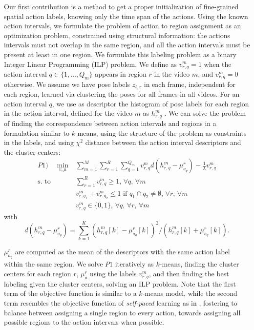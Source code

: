Our first contribution is a method to get a proper initialization of fine-grained spatial action labels, knowing only the time span of the actions. Using the known action intervals,  we formulate the problem of action to region assignment as an optimization problem, constrained using structural information: the actions intervals must not overlap in the same region, and all the action intervals must be present at least in one region. We formulate this labeling problem as a binary Integer Linear Programming (ILP) problem. We define as $v_{r,q}^m=1$ when the action interval $q \in \{1,\dots,Q_m\}$ appears in region $r$ in the video $m$, and $v_{r,q}^m=0$ otherwise. We assume we have pose labels $z_{t,r}$ in each frame, independent for each region, learned via clustering the poses for all frames in all videos. For an action interval $q$, we use as descriptor the histogram of pose labels for each region in the action interval, defined for the video $m$ as $h_{r,q}^m$ . We can solve the problem of finding the correspondence between action intervals and regions in a formulation similar to $k$-means, using the structure of the problem as constraints in the labels, and using $\chi^2$ distance between the action interval descriptors and the cluster centers: 
\begin{equation}
\begin{split}
P1) \quad \min_{v,\mu} &\sum_{m=1}^M  \sum_{r=1}^R \sum_{q=1}^{Q_m}  v_{r,q}^m d( h_{r,q}^m - \mu_{a_q}^r) -\frac{1}{\lambda} v_{r,q}^m\\ 
 \text{s. to} 
\quad 
& \sum_{r=1}^R v_{r,q}^m \ge 1\text{, }\forall q\text{, }\forall m \\ 
& v_{r,q_1}^m + v_{r,q_2}^m \le 1 \text{ if } q_1\cap q_2 \neq \emptyset \text{, }\forall r\text{, }\forall m\\  
& v_{r,q}^m \in \{0,1\}\text{, }\forall q\text{, }\forall{r}\text{, }\forall m
\end{split}
\end{equation}
with
\begin{equation}
d( h_{r,q}^m - \mu_{a_q}^r) = \sum_{k=1}^K (h_{r,q}^m[k] - \mu_{a_q}^r[k])^2/(h_{r,q}^m[k] +\mu_{a_q}^r[k]).
\end{equation}

$\mu_{a_q}^r$ are computed as the mean of the descriptors with the same action label within the same region. We solve $P1$ iteratively as $k$-means,  finding the cluster centers for each region $r$, $\mu_{a}^r$ using the labels $v_{r,q}^m$, and then finding the best labeling given the cluster centers, solving an ILP problem. Note that the first term of the objective function is similar to a $k$-means model, while the second term resembles the objective function of \emph{self-paced} learning as in \cite{Kumar2010}, fostering to balance between assigning a single region to every action, towards assigning all possible regions to the action intervals when possible.  

